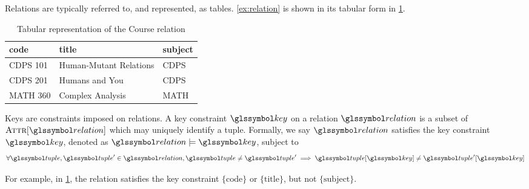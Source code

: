 	Relations are typically referred to, and represented, as tables.  \cref{ex:relation} is shown in its tabular form in \cref{tbl:course-relation}.
	
	\begin{table}
		\centering
		
		\begin{tabular}{lll}
			\toprule
			code & title & subject \\
			\midrule
			CDPS 101 & Human-Mutant Relations & CDPS \\
			CDPS 201 & Humans and You & CDPS \\
			MATH 360 & Complex Analysis & MATH \\
			\bottomrule
		\end{tabular}
		
		\caption{Tabular representation of the Course relation}
		\label{tbl:course-relation}
	\end{table}
	
	\begin{defn}[Keys]
	\label{def:keys}
		Keys are constraints imposed on relations.	A key constraint \(\key\) on a relation \(\relation\) is a subset of \(\attributes{\relation}\) which may uniquely identify a tuple.	Formally, we say \(\relation\) satisfies the key constraint \(\key\), denoted as \(\relation \models \key\), subject to
		\[
			\forall \tuple, \tuple' \in \relation, \tuple \not= \tuple' \implies \tuple\lbrack\key\rbrack \not= \tuple'\lbrack\key\rbrack
		\]
		
		For example, in \cref{tbl:course-relation}, the relation satisfies the key constraint \(\{\text{code}\}\) or \(\{\text{title}\}\), but not \(\{\text{subject}\}\).
	\end{defn}
	
